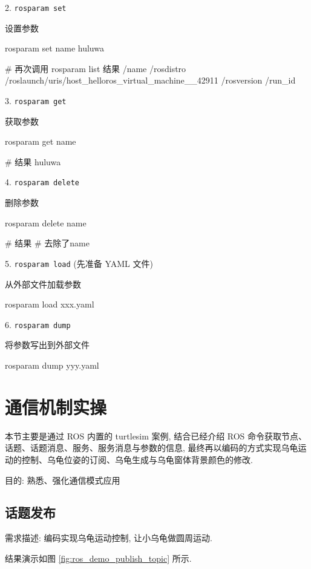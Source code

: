 \documentclass[openany, fontset=windowsold]{ctexbook}
\theoremstyle{kaiti}
\theoremstyle{normal}
\begin{document}
2. \verb|rosparam set|

设置参数
\begin{bash}
  rosparam set name huluwa

  # 再次调用 rosparam list 结果
  /name
  /rosdistro
  /roslaunch/uris/host_helloros_virtual_machine__42911
  /rosversion
  /run_id
\end{bash}

3. \verb|rosparam get|

获取参数
\begin{bash}
  rosparam get name

  # 结果
  huluwa
\end{bash}

4. \verb|rosparam delete|

删除参数
\begin{bash}
  rosparam delete name

  # 结果
  # 去除了name
\end{bash}

5. \verb|rosparam load| (先准备 YAML 文件)

从外部文件加载参数

\begin{bash}
  rosparam load xxx.yaml
\end{bash}

6. \verb|rosparam dump|

将参数写出到外部文件

\begin{bash}
  rosparam dump yyy.yaml
\end{bash}

\section{通信机制实操}

本节主要是通过 ROS 内置的 turtlesim 案例, 结合已经介绍 ROS 命令获取节点、话题、话题消息、服务、服务消息与参数的信息, 最终再以编码的方式实现乌龟运动的控制、乌龟位姿的订阅、乌龟生成与乌龟窗体背景颜色的修改.

目的: 熟悉、强化通信模式应用

\subsection{话题发布}

需求描述: 编码实现乌龟运动控制, 让小乌龟做圆周运动.

结果演示如图 \ref{fig:ros_demo_publish_topic} 所示.
\end{document}
